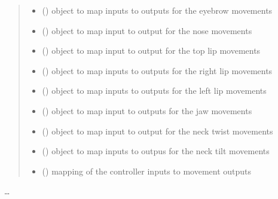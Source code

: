 \documentclass[letterpaper,10pt,english]{sphinxmanual}
\begin{document}
\begin{fulllineitems}
\begin{quote}
\begin{description}
\begin{itemize}
\item {} 
\sphinxAtStartPar
{}() \textendash{} object to map inputs to 
outputs for the eyebrow movements

\item {} 
\sphinxAtStartPar
{}() \textendash{} object to map input to 
output for the nose movements

\item {} 
\sphinxAtStartPar
{}() \textendash{} object to map input 
to output for the top lip movements

\item {} 
\sphinxAtStartPar
{}() \textendash{} object to map inputs to 
outputs for the right lip movements

\item {} 
\sphinxAtStartPar
{}() \textendash{} object to map inputs to 
outputs for the left lip movements

\item {} 
\sphinxAtStartPar
{}() \textendash{} object to map input to 
outputs for the jaw movements

\item {} 
\sphinxAtStartPar
{}() \textendash{} object to map input 
to output for the neck twist movements

\item {} 
\sphinxAtStartPar
{}() \textendash{} object to map inputs to 
outpus for the neck tilt movements

\item {} 
\sphinxAtStartPar
{}() \textendash{} mapping of the controller inputs to movement 
outputs

\end{itemize}

\end{description}\end{quote}

\sphinxAtStartPar
…


\end{fulllineitems}
\end{document}
